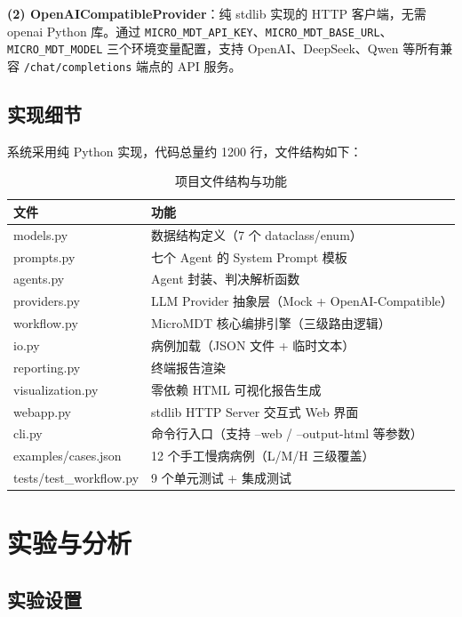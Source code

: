 \documentclass[11pt,a4paper]{ctexart}
\begin{document}
\textbf{(2) OpenAICompatibleProvider}：纯 stdlib 实现的 HTTP 客户端，无需 openai Python 库。通过 \texttt{MICRO\_MDT\_API\_KEY}、\texttt{MICRO\_MDT\_BASE\_URL}、\texttt{MICRO\_MDT\_MODEL} 三个环境变量配置，支持 OpenAI、DeepSeek、Qwen 等所有兼容 \texttt{/chat/completions} 端点的 API 服务。

\subsection{实现细节}

系统采用纯 Python 实现，代码总量约 1200 行，文件结构如下：

\begin{table}[H]
\centering
\caption{项目文件结构与功能}
\begin{tabularx}{\textwidth}{l|X}
\toprule
\textbf{文件} & \textbf{功能} \\
\midrule
models.py & 数据结构定义（7 个 dataclass/enum） \\
prompts.py & 七个 Agent 的 System Prompt 模板 \\
agents.py & Agent 封装、判决解析函数 \\
providers.py & LLM Provider 抽象层（Mock + OpenAI-Compatible） \\
workflow.py & MicroMDT 核心编排引擎（三级路由逻辑） \\
io.py & 病例加载（JSON 文件 + 临时文本） \\
reporting.py & 终端报告渲染 \\
visualization.py & 零依赖 HTML 可视化报告生成 \\
webapp.py & stdlib HTTP Server 交互式 Web 界面 \\
cli.py & 命令行入口（支持 --web / --output-html 等参数） \\
examples/cases.json & 12 个手工慢病病例（L/M/H 三级覆盖） \\
tests/test\_workflow.py & 9 个单元测试 + 集成测试 \\
\bottomrule
\end{tabularx}
\end{table}

\newpage
\section{实验与分析}

\subsection{实验设置}
\end{document}
